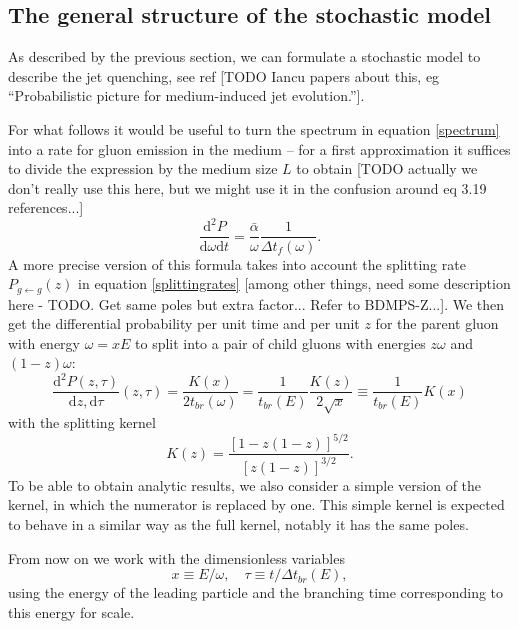 \documentclass[a4paper,12pt]{article}
\numberwithin{equation}{section}
\begin{document}
\subsection{The general structure of the stochastic model}

As described by the previous section, we can formulate a stochastic model to describe the jet quenching, see ref [TODO Iancu papers about this, eg “Probabilistic picture for medium-induced jet evolution.”]. 


For what follows it would be useful to turn the spectrum in equation \eqref{spectrum} into a rate for gluon emission in the medium -- for a first approximation it suffices to divide the expression by the medium size $L$ to obtain [TODO actually we don't really use this here, but we might use it in the confusion around eq 3.19 references...]
\begin{equation}
\frac{\mathrm{d}^2P}{\mathrm{d}\omega \mathrm{d}t} =\frac{\bar{\alpha}}{\omega}\frac{1}{\Delta t_f(\omega)}.
\end{equation}
A more precise version of this formula takes into account the splitting rate $P_{g \leftarrow g}(z)$ in equation \eqref{splittingrates} [among other things, need some description here - TODO. Get same poles but extra factor... Refer to BDMPS-Z...]. We then get the differential probability per unit time and per unit $z$ for the parent gluon with energy $\omega = xE$ to split into a pair of child gluons with energies $z\omega$ and $(1-z)\omega$:
\begin{equation}
\frac{\mathrm{d}^2 P(z,\tau)}{\mathrm{d}z,\mathrm{d}\tau}(z,\tau)=\frac{K(x)}{2t_{br}(\omega)}=\frac{1}{t_{br}(E)}\frac{K(z)}{2 \sqrt{x}} \equiv \frac{1}{t_{br}(E)}K(x)
\end{equation}
with the splitting kernel
\begin{equation}\label{kernel}
K(z)=\frac{[1-z(1-z)]^{5/2}}{[z(1-z)]^{3/2}}.
\end{equation}
To be able to obtain analytic results, we also consider a simple version of the kernel, in which the numerator is replaced by one. This simple kernel is expected to behave in a similar way as the full kernel, notably it has the same poles.

From now on we work with the dimensionless variables 
\begin{equation}\label{rescaled}
x \equiv E/\omega, \quad \tau \equiv t/\Delta t_{br}(E),
\end{equation}
using the energy of the leading particle and the branching time corresponding to this energy for scale.
\end{document}
